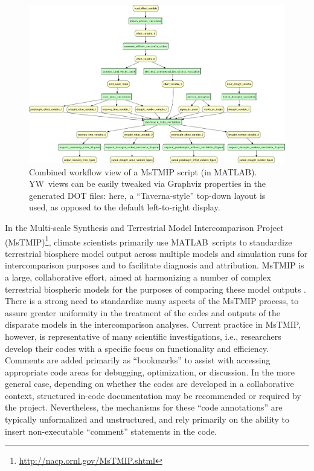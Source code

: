 \documentclass{article}
\newcommand{\yw}{\textsf{YW}}
\newcommand{\MATLAB}{\textsf{MATLAB}}
\begin{document}
  \begin{figure}[t]
   \centering
   \includegraphics[width=.99\textwidth]{MsTMIP_combined-crop.pdf}
   \caption{Combined workflow view of a MsTMIP script (in
     \MATLAB). \yw\ views can be easily tweaked via Graphviz
     properties in the generated DOT files: here, a ``Taverna-style''
     \protect\cite{oinn2004taverna}
     top-down layout is used, as opposed to the default left-to-right
     display.}
   \label{fig-mstmip}
 \end{figure}


In the Multi-scale Synthesis and Terrestrial Model Intercomparison
Project (MsTMIP)\footnote{\url{http://nacp.ornl.gov/MsTMIP.shtml}},
climate scientists primarily use \MATLAB\ scripts to standardize
terrestrial biosphere model output across multiple models and
simulation runs for intercomparison purposes and to facilitate
diagnosis and attribution.
MsTMIP is a large, collaborative effort, aimed at harmonizing a number
of complex terrestrial biospheric models for the purposes of comparing
these model outputs \cite{huntzinger2013north}. There is a strong need
to standardize many aspects of the MsTMIP process, to assure greater
uniformity in the treatment of the codes and outputs of the disparate
models in the intercomparison analyses. Current practice in MsTMIP,
however, is representative of many scientific investigations, i.e.,
researchers develop their codes with a specific focus on functionality
and efficiency. Comments are added primarily as ``bookmarks'' to
assist with accessing appropriate code areas for debugging,
optimization, or discussion. In the more general case, depending on
whether the codes are developed in a collaborative context, structured
in-code documentation may be recommended or required by the
project. Nevertheless,  the mechanisms for these ``code annotations'' are
typically unformalized and unstructured, and rely primarily on the
ability to insert non-executable ``comment'' statements in the code.
\end{document}
